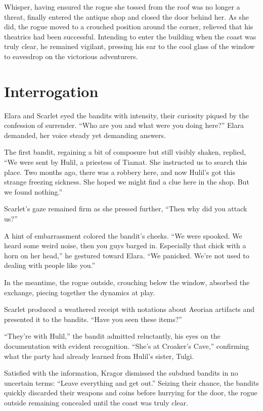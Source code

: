 \documentclass[
  letterpaper,12pt,twoside,twocolumn,openany,
  nodeprecatedcode,bg=full]{dndbook}
\begin{document}
Whisper, having ensured the rogue she tossed from the roof was no longer
a threat, finally entered the antique shop and closed the door behind
her. As she did, the rogue moved to a crouched position around the
corner, relieved that his theatrics had been successful. Intending to
enter the building when the coast was truly clear, he remained vigilant,
pressing his ear to the cool glass of the window to eavesdrop on the
victorious adventurers.

\section{Interrogation}\label{interrogation}

Elara and Scarlet eyed the bandits with intensity, their curiosity
piqued by the confession of surrender. ``Who are you and what were you
doing here?'' Elara demanded, her voice steady yet demanding answers.

The first bandit, regaining a bit of composure but still visibly shaken,
replied, ``We were sent by Hulil, a priestess of Tiamat. She instructed
us to search this place. Two months ago, there was a robbery here, and
now Hulil's got this strange freezing sickness. She hoped we might find
a clue here in the shop. But we found nothing.''

Scarlet's gaze remained firm as she pressed further, ``Then why did you
attack us?''

A hint of embarrassment colored the bandit's cheeks. ``We were spooked.
We heard some weird noise, then you guys barged in. Especially that
chick with a horn on her head,'' he gestured toward Elara. ``We
panicked. We're not used to dealing with people like you.''

In the meantime, the rogue outside, crouching below the window, absorbed
the exchange, piecing together the dynamics at play.

Scarlet produced a weathered receipt with notations about Aeorian
artifacts and presented it to the bandits. ``Have you seen these
items?''

``They're with Hulil,'' the bandit admitted reluctantly, his eyes on the
documentation with evident recognition. ``She's at Croaker's Cave,''
confirming what the party had already learned from Hulil's sister,
Tulgi.

Satisfied with the information, Kragor dismissed the subdued bandits in
no uncertain terms: ``Leave everything and get out.'' Seizing their
chance, the bandits quickly discarded their weapons and coins before
hurrying for the door, the rogue outside remaining concealed until the
coast was truly clear.
\end{document}
